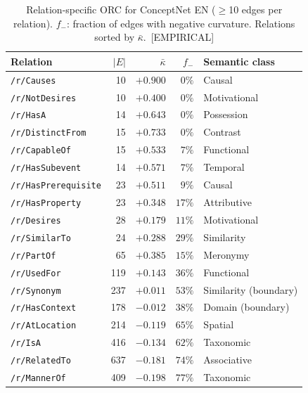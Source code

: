 \documentclass[11pt,a4paper]{article}
\newcommand{\kbar}{\bar{\kappa}}
\begin{document}
\begin{table}[h]
\centering
\small
\caption{Relation-specific ORC for ConceptNet EN ($\geq$10 edges per relation). $f_-$: fraction of edges with negative curvature. Relations sorted by $\kbar$.~[EMPIRICAL]}
\label{tab:relation_orc}
\begin{tabular}{@{}lrrrl@{}}
\toprule
Relation & $|E|$ & $\kbar$ & $f_-$ & Semantic class \\
\midrule
\texttt{/r/Causes}          &  10 & $+0.900$ & $0\%$    & Causal \\
\texttt{/r/NotDesires}      &  10 & $+0.400$ & $0\%$    & Motivational \\
\texttt{/r/HasA}            &  14 & $+0.643$ & $0\%$    & Possession \\
\texttt{/r/DistinctFrom}    &  15 & $+0.733$ & $0\%$    & Contrast \\
\texttt{/r/CapableOf}       &  15 & $+0.533$ & $7\%$    & Functional \\
\texttt{/r/HasSubevent}     &  14 & $+0.571$ & $7\%$    & Temporal \\
\texttt{/r/HasPrerequisite} &  23 & $+0.511$ & $9\%$    & Causal \\
\texttt{/r/HasProperty}     &  23 & $+0.348$ & $17\%$   & Attributive \\
\texttt{/r/Desires}         &  28 & $+0.179$ & $11\%$   & Motivational \\
\texttt{/r/SimilarTo}       &  24 & $+0.288$ & $29\%$   & Similarity \\
\texttt{/r/PartOf}          &  65 & $+0.385$ & $15\%$   & Meronymy \\
\texttt{/r/UsedFor}         & 119 & $+0.143$ & $36\%$   & Functional \\
\texttt{/r/Synonym}         & 237 & $+0.011$ & $53\%$   & Similarity (boundary) \\
\texttt{/r/HasContext}      & 178 & $-0.012$ & $38\%$   & Domain (boundary) \\
\texttt{/r/AtLocation}      & 214 & $-0.119$ & $65\%$   & Spatial \\
\texttt{/r/IsA}             & 416 & $-0.134$ & $62\%$   & Taxonomic \\
\texttt{/r/RelatedTo}       & 637 & $-0.181$ & $74\%$   & Associative \\
\texttt{/r/MannerOf}        & 409 & $-0.198$ & $77\%$   & Taxonomic \\
\bottomrule
\end{tabular}
\end{table}
\end{document}
